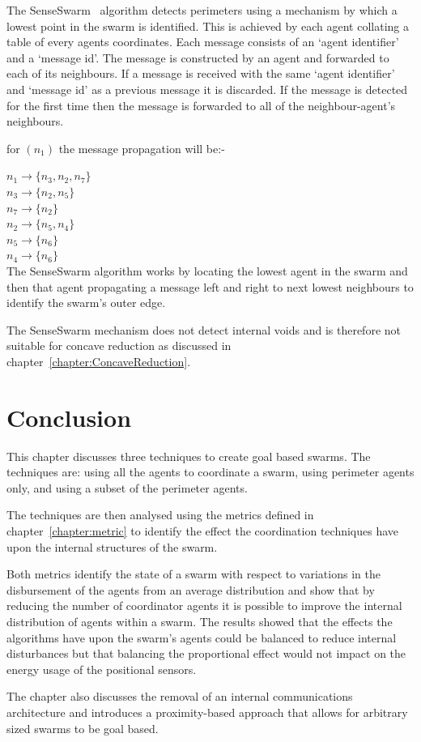 The SenseSwarm~\cite{ZAPS:07, APZDAMC:09, AZDPS:11} algorithm detects perimeters using a mechanism by which a lowest point in the swarm is identified. This is achieved by each agent collating a table of every agents coordinates. Each message consists of an `agent identifier' and a `message id'. The message is constructed by an agent and forwarded to each of its neighbours. If a message is received with the same `agent identifier' and `message id' as a previous message it is discarded. If the message is detected for the first time then the message is forwarded to all of the neighbour-agent's neighbours.

for $(n_1)$ the message propagation will be:-

$n_1 \to \{n_3, n_2, n_7\}$ \\
$n_3 \to \{n_2, n_5\}$\\
$n_7 \to \{n_2\}$\\
$n_2 \to \{n_5, n_4\}$\\
$n_5 \to \{n_6\}$\\
$n_4 \to \{n_6\}$\\

The SenseSwarm algorithm works by locating the lowest agent in the swarm and then that agent propagating a message left and right to next lowest neighbours to identify the swarm's outer edge. 

The SenseSwarm mechanism does not detect internal voids and is therefore not suitable for concave reduction as discussed in chapter~\ref{chapter:ConcaveReduction}.

\section{Conclusion\label{methods:Conclusion}}

This chapter discusses three techniques to create goal based swarms. The techniques are: using all the agents to coordinate a swarm, using perimeter agents only, and using a subset of the perimeter agents. 

The techniques are then analysed using the metrics defined in chapter~\ref{chapter:metric} to identify the effect the coordination techniques have upon the internal structures of the swarm.

Both metrics identify the state of a swarm with respect to variations in the disbursement of the agents from an average distribution and show that by reducing the number of coordinator agents it is possible to improve the internal distribution of agents within a swarm. The results showed that the effects the algorithms have upon the swarm's agents could be balanced to reduce internal disturbances but that balancing the proportional effect would not impact on the energy usage of the positional sensors. 

The chapter also discusses the removal of an internal communications architecture and introduces a proximity-based approach that allows for arbitrary sized swarms to be goal based. 

